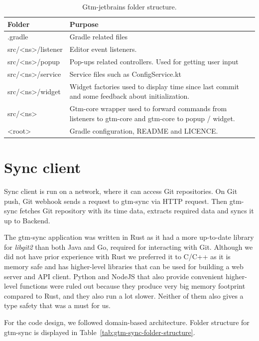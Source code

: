 \begin{table}[h]
    \centering
    \begin{tabular}{ | p{3cm} | p{10cm} |}
        \hline
        \textbf{Folder} & \textbf{Purpose}\\
        \hline
        .gradle & Gradle related files\\
        \hline
        src/<ns>/listener & Editor event listeners.\\
        \hline
        src/<ns>/popup & Pop-ups related controllers.
        Used for getting user input\\
        \hline
        src/<ns>/service & Service files such as ConfigService.kt\\
        \hline
        src/<ns>/widget & Widget factories used to display time since last commit and some feedback about initialization.\\
        \hline
        src/<ns> & Gtm-core wrapper used to forward commands from listeners to gtm-core and gtm-core to popup / widget.\\
        \hline
        <root> & Gradle configuration, README and LICENCE.\\
        \hline
    \end{tabular}
    \caption{Gtm-jetbrains folder structure.}
    \label{tab:gtm-jetbrains-folder-structure}
\end{table}

\section{Sync client}\label{sec:sync-client}
Sync client is run on a network, where it can access Git repositories.
On Git push, Git webhook sends a request to gtm-sync via HTTP request.
Then gtm-sync fetches Git repository with its time data, extracts required data and syncs it up to Backend.

The gtm-sync application was written in Rust as it had a more up-to-date library for \textit{libgit2} than both Java and Go, required for interacting with Git.
Although we did not have prior experience with Rust we preferred it to C/C++ as it is memory safe and has higher-level libraries that can be
used for building a web server and API client.
Python and NodeJS that also provide convenient higher-level functions were ruled out because they produce very
big memory footprint compared to Rust, and they also run a lot slower.
Neither of them also gives a type safety that was a must for us.

For the code design, we followed domain-based architecture.
Folder structure for gtm-sync is displayed in Table~\ref{tab:gtm-sync-folder-structure}.

